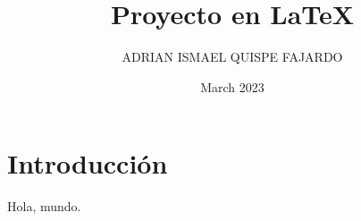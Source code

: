 \documentclass{article}
\title{Proyecto en \LaTeX}
\author{ADRIAN ISMAEL QUISPE FAJARDO}
\date{March 2023}
\begin{document}
\maketitle

\section{Introducción}
Hola, mundo.\\
\lipsum[5]
\end{document}

